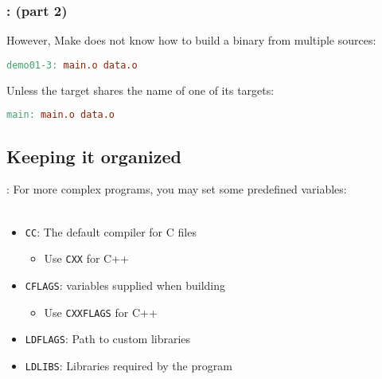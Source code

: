 \begin{frame}[fragile]
    \frametitle{\secname: \small\subsecname (part 2)\normalsize}

    However, Make does not know how to build a binary from multiple sources:

    \small \begin{lstlisting}[language=make]
demo01-3: main.o data.o
    \end{lstlisting} \normalsize

    Unless the target shares the name of one of its targets:
    \small \begin{lstlisting}[language=make]
main: main.o data.o
    \end{lstlisting} \normalsize
\end{frame}

%
%
%

\subsection{Keeping it organized}
\begin{frame}{\secname: \small\subsecname\normalsize}
    For more complex programs, you may set some predefined
    variables: \\~\\

    \begin{itemize}
        \item \texttt{CC}: The default compiler for C files
        \begin{itemize}
            \item Use \texttt{CXX} for C++
        \end{itemize}
        \item \texttt{CFLAGS}: variables supplied when building
        \begin{itemize}
            \item Use \texttt{CXXFLAGS} for C++
        \end{itemize}
        \item \texttt{LDFLAGS}: Path to custom libraries
        \item \texttt{LDLIBS}: Libraries required by the program
    \end{itemize}
\end{frame}

